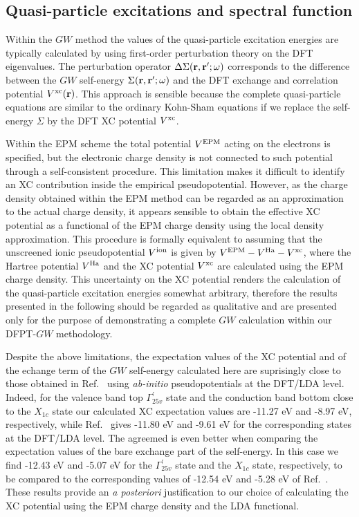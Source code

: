 \documentclass[twocolumn,prb,showpacs,superscriptaddress]{revtex4}
\def\w{\omega}
\def\r{{\bf r}}
\def\rp{{\bf r^\prime}}
\begin{document}
\subsection{Quasi-particle excitations and spectral function}\label{sec.5d}

Within the $GW$ method the values of the quasi-particle excitation energies are typically 
calculated by using first-order perturbation theory on the DFT eigenvalues.\cite{hl86}
The perturbation operator $\Delta \Sigma(\r,\rp;\w)$ corresponds to the difference between 
the $GW$ self-energy $\Sigma(\r,\rp;\w)$ and the DFT exchange and correlation potential $V^{\rm xc}(\r)$.
This approach is sensible because the complete quasi-particle equations
are similar to the ordinary Kohn-Sham equations if we replace the self-energy $\Sigma$
by the DFT XC potential $V^{\rm xc}$.\cite{hl} 

Within the EPM scheme the total potential $V^{\rm EPM}$ acting on the electrons is specified,\cite{cohen_berg}
but the electronic charge density is not connected to such potential
through a self-consistent procedure.\cite{appelbaum}
This limitation makes it difficult to identify an XC contribution inside the empirical
pseudopotential. However, as the charge density obtained within the EPM method can be regarded 
as an approximation to the actual charge density,\cite{EPM-density}
it appears sensible to obtain the effective XC potential
as a functional of the EPM charge density
using the local density approximation.\cite{lda1,lda2}
This procedure is formally equivalent to assuming that the unscreened ionic pseudopotential
$V^{\rm ion}$ is given by $V^{\rm EPM} - V^{\rm Ha} - V^{\rm xc}$, where
the Hartree potential $V^{\rm Ha}$ and the XC potential $V^{\rm xc}$ are calculated using the EPM charge density.
%
This uncertainty on the XC potential renders the calculation of the quasi-particle
excitation energies somewhat arbitrary, therefore the results presented in the following
should be regarded as qualitative and are presented only for the purpose of demonstrating 
a complete $GW$  calculation within our DFPT-$GW$ methodology.

Despite the above limitations, the expectation values of the
XC potential and of the echange term of the $GW$ self-energy calculated here are suprisingly
close to those obtained in Ref.\  using {\it ab-initio} pseudopotentials
at the DFT/LDA level. Indeed, for the valence band top 
$\Gamma_{25v}^\prime$ state and the conduction band bottom close to the $X_{1c}$ state
our calculated XC expectation values are -11.27 eV and -8.97 eV, respectively,
while Ref.\  gives -11.80 eV and -9.61 eV for the corresponding states
at the DFT/LDA level. The agreemed is even better when comparing the expectation values
of the bare exchange part of the self-energy. In this case we find -12.43 eV and -5.07 eV
for the $\Gamma_{25v}^\prime$ state and the $X_{1c}$ state, respectively, to be compared
to the corresponding values of -12.54 eV and -5.28 eV of Ref.~.
These results provide an {\it a posteriori} justification to our choice of calculating
the XC potential using the EPM charge density and the LDA functional.
\end{document}
